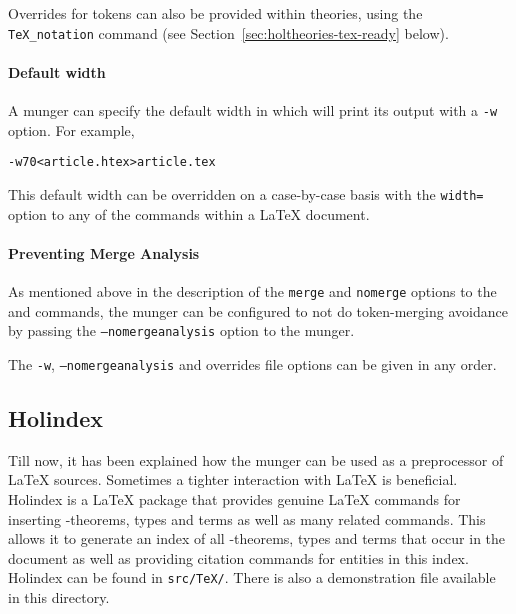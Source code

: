 Overrides for \HOL{} tokens can also be provided within \HOL{}
theories, using the
\texttt{TeX\_notation} command (see
Section~\ref{sec:holtheories-tex-ready} below).

\paragraph{Default width}
A munger can specify the default width in which \HOL{} will print its
output with a \texttt{-w} option.
%
For example,
\begin{alltt}
   \munge -w70 < article.htex > article.tex
\end{alltt}
This default width can be overridden on a case-by-case basis with the
\texttt{width=} option to any of the commands within a \LaTeX{}
document.

\paragraph{Preventing Merge Analysis}  As mentioned above in the description of the \texttt{merge} and \texttt{nomerge} options to the \holtm{} and \holthm{} commands, the munger can be configured to not do token-merging avoidance by passing the \texttt{--nomergeanalysis} option to the munger.

\smallskip \noindent The \texttt{-w}, \texttt{--nomergeanalysis} and
overrides file options can be given in any order.

\subsection{Holindex}

Till now, it has been explained how the munger can be used as a preprocessor of \LaTeX{} sources.
Sometimes a tighter interaction with \LaTeX{} is beneficial.
Holindex is a \LaTeX{} package that provides genuine \LaTeX{} commands for inserting \HOL{}-theorems, types and terms as well as many related commands.
This allows it to generate an index of all \HOL{}-theorems, types and terms that occur in the document as well as providing citation commands for \HOL{} entities in this index.
Holindex can be found in \texttt{src/TeX/}.
There is also a demonstration file available in this directory.


